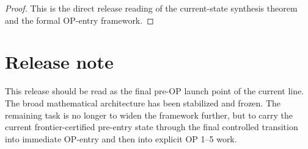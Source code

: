 \begin{proof}
This is the direct release reading of the current-state synthesis theorem and the formal OP-entry framework.
\end{proof}

\section*{Release note}
This release should be read as the final pre-OP launch point of the current line. The broad mathematical architecture has been stabilized and frozen. The remaining task is no longer to widen the framework further, but to carry the current frontier-certified pre-entry state through the final controlled transition into immediate OP-entry and then into explicit OP 1--5 work.
